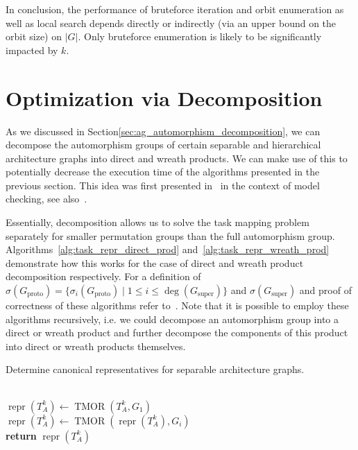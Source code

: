 In conclusion, the performance of bruteforce iteration and orbit enumeration as
well as local search depends directly or indirectly (via an upper bound on the
orbit size) on $|G|$. Only bruteforce enumeration is likely to be significantly
impacted by $k$.

\section{Optimization via Decomposition}
\label{sec:tmor_optimization_via_decomposition}

As we discussed in Section\ref{sec:ag_automorphism_decomposition}, we can
decompose the automorphism groups of certain separable and hierarchical
architecture graphs into direct and wreath products. We can make use of this to
potentially decrease the execution time of the algorithms presented in the
previous section. This idea was first presented in~\cite{Donaldson} in the
context of model checking, see also~\cite{DonaldsonThesis}.

Essentially, decomposition allows us to solve the task mapping problem
separately for smaller permutation groups than the full automorphism group.
Algorithms~\ref{alg:task_repr_direct_prod} and~\ref{alg:task_repr_wreath_prod}
demonstrate how this works for the case of direct and wreath product
decomposition respectively. For a definition of $\sigma(G_{\mathrm{proto}}) =
\{\sigma_i(G_{\mathrm{proto}}) \mid 1 \leq i \leq
\operatorname{deg}(G_{\mathrm{super}})\}$ and $\sigma(G_{\mathrm{super}})$ and
proof of correctness of these algorithms refer to~\cite{Donaldson}. Note that
it is possible to employ these algorithms recursively, i.e. we could decompose
an automorphism group into a direct or wreath product and further decompose the
components of this product into direct or wreath products themselves.

\begin{algorithm}
  \caption{Determine canonical representatives for separable architecture graphs.}
  \label{alg:task_repr_direct_prod}
  \begin{algorithmic}[1]
    \\
    \State $\operatorname{repr}(T_A^k) \gets
           \operatorname{TMOR}(T_A^k, G_1)$
    \\
      \State $\operatorname{repr}(T_A^k) \gets
             \operatorname{TMOR}(\operatorname{repr}(T_A^k), G_i)$
    \EndFor
    \\
    \State \textbf{return} $\operatorname{repr}(T_A^k)$
  \EndProcedure
  \end{algorithmic}
\end{algorithm}

